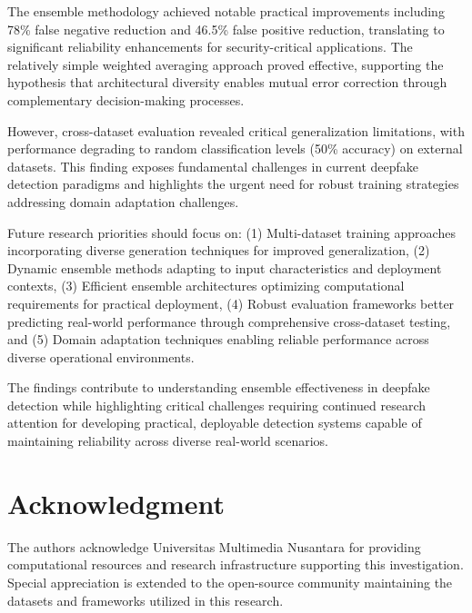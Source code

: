 \documentclass[conference]{IEEEtran}
\begin{document}
The ensemble methodology achieved notable practical improvements including 78\% false negative reduction and 46.5\% false positive reduction, translating to significant reliability enhancements for security-critical applications. The relatively simple weighted averaging approach proved effective, supporting the hypothesis that architectural diversity enables mutual error correction through complementary decision-making processes.

However, cross-dataset evaluation revealed critical generalization limitations, with performance degrading to random classification levels (50\% accuracy) on external datasets. This finding exposes fundamental challenges in current deepfake detection paradigms and highlights the urgent need for robust training strategies addressing domain adaptation challenges.

Future research priorities should focus on: (1) Multi-dataset training approaches incorporating diverse generation techniques for improved generalization, (2) Dynamic ensemble methods adapting to input characteristics and deployment contexts, (3) Efficient ensemble architectures optimizing computational requirements for practical deployment, (4) Robust evaluation frameworks better predicting real-world performance through comprehensive cross-dataset testing, and (5) Domain adaptation techniques enabling reliable performance across diverse operational environments.

The findings contribute to understanding ensemble effectiveness in deepfake detection while highlighting critical challenges requiring continued research attention for developing practical, deployable detection systems capable of maintaining reliability across diverse real-world scenarios.

\section*{Acknowledgment}

The authors acknowledge Universitas Multimedia Nusantara for providing computational resources and research infrastructure supporting this investigation. Special appreciation is extended to the open-source community maintaining the datasets and frameworks utilized in this research.



\end{document}
